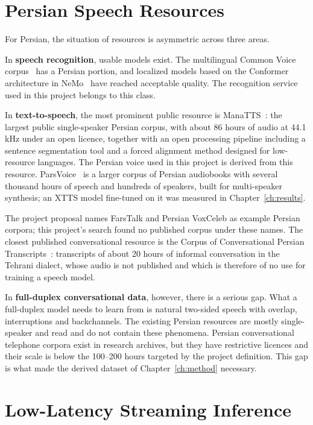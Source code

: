 \section{Persian Speech Resources}
\label{sec:persian-resources}

For Persian, the situation of resources is asymmetric across three areas.

In \textbf{speech recognition}, usable models exist. The multilingual Common Voice
corpus~\cite{ardila2020commonvoice} has a Persian portion, and localized models
based on the Conformer architecture in NeMo~\cite{kuchaiev2019nemo} have reached
acceptable quality. The recognition service used in this project belongs to this
class.

In \textbf{text-to-speech}, the most prominent public resource is
ManaTTS~\cite{qharabagh2025manatts}: the largest public single-speaker Persian
corpus, with about 86 hours of audio at 44.1 kHz under an open licence, together with
an open processing pipeline including a sentence segmentation tool and a forced
alignment method designed for low-resource languages. The Persian voice used in this
project is derived from this resource. ParsVoice~\cite{ranjbar2025parsvoice} is a
larger corpus of Persian audiobooks with several thousand hours of speech and
hundreds of speakers, built for multi-speaker synthesis; an XTTS model fine-tuned on
it was measured in Chapter~\ref{ch:results}.

The project proposal names FarsTalk and Persian VoxCeleb as example Persian corpora;
this project's search found no published corpus under these names. The closest
published conversational resource is the Corpus of Conversational Persian
Transcripts~\cite{mohammadi2019ccpt}: transcripts of about 20 hours of informal
conversation in the Tehrani dialect, whose audio is not published and which is
therefore of no use for training a speech model.

In \textbf{full-duplex conversational data}, however, there is a serious gap. What a
full-duplex model needs to learn from is natural two-sided speech with overlap,
interruptions and backchannels. The existing Persian resources are mostly
single-speaker and read and do not contain these phenomena. Persian conversational
telephone corpora exist in research archives, but they have restrictive licences and
their scale is below the 100--200 hours targeted by the project definition. This gap
is what made the derived dataset of Chapter~\ref{ch:method} necessary.

\section{Low-Latency Streaming Inference}
\label{sec:streaming-lit}

